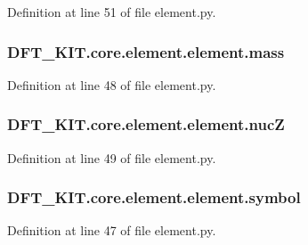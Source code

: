 Definition at line 51 of file element.\+py.

\hypertarget{class_d_f_t___k_i_t_1_1core_1_1element_1_1element_a798861de085eb85aebbcdedd54371731}{
\subsubsection[{mass}]{\setlength{\rightskip}{0pt plus 5cm}D\+F\+T\+\_\+\+K\+I\+T.\+core.\+element.\+element.\+mass}}\label{class_d_f_t___k_i_t_1_1core_1_1element_1_1element_a798861de085eb85aebbcdedd54371731}


Definition at line 48 of file element.\+py.

\hypertarget{class_d_f_t___k_i_t_1_1core_1_1element_1_1element_a9fdfc898296fd99c70addb3a7f9d7616}{
\subsubsection[{nuc\+Z}]{\setlength{\rightskip}{0pt plus 5cm}D\+F\+T\+\_\+\+K\+I\+T.\+core.\+element.\+element.\+nuc\+Z}}\label{class_d_f_t___k_i_t_1_1core_1_1element_1_1element_a9fdfc898296fd99c70addb3a7f9d7616}


Definition at line 49 of file element.\+py.

\hypertarget{class_d_f_t___k_i_t_1_1core_1_1element_1_1element_ab2919368378ec5a3c88f561701437ca0}{
\subsubsection[{symbol}]{\setlength{\rightskip}{0pt plus 5cm}D\+F\+T\+\_\+\+K\+I\+T.\+core.\+element.\+element.\+symbol}}\label{class_d_f_t___k_i_t_1_1core_1_1element_1_1element_ab2919368378ec5a3c88f561701437ca0}


Definition at line 47 of file element.\+py.

